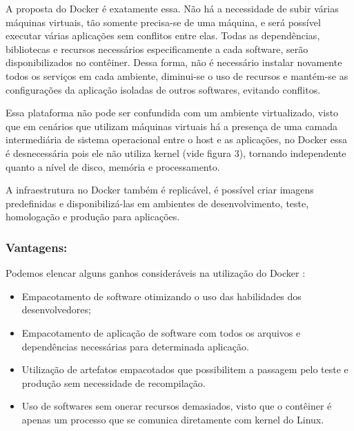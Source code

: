A proposta do Docker é exatamente essa. Não há a necessidade de subir várias máquinas virtuais, tão somente precisa-se de uma máquina, e será possível executar várias aplicações sem conflitos entre elas. Todas as dependências, bibliotecas e recursos necessários especificamente a cada software, serão disponibilizados no contêiner. Dessa forma, não é necessário instalar novamente todos os serviços em cada ambiente, diminui-se o uso de recursos e mantém-se as configurações da aplicação isoladas de outros softwares, evitando conflitos. \cite{scampini}

Essa plataforma não pode ser confundida com um ambiente virtualizado, visto que em cenários que utilizam máquinas virtuais há a presença de uma camada intermediária de sistema operacional entre o host e as aplicações, no Docker essa é desnecessária pois ele não utiliza kernel (vide figura 3), tornando independente quanto a nível de disco, memória e processamento.\cite{mouat}

A infraestrutura no Docker também é replicável, é possível criar imagens predefinidas e disponibilizá-las em ambientes de desenvolvimento, teste, homologação e produção para aplicações.\cite{mattiaskane}

\subsubsection{Vantagens:}
Podemos elencar alguns ganhos consideráveis na utilização do Docker \cite{scampini} :
\begin{itemize}
\item Empacotamento de software otimizando o uso das habilidades dos desenvolvedores;
\item Empacotamento de aplicação de software com todos os arquivos e dependências necessárias para determinada aplicação.
\item Utilização de artefatos empacotados que possibilitem a passagem pelo teste e produção sem necessidade de recompilação.
\item Uso de softwares sem onerar recursos demasiados, visto que o contêiner é apenas um processo que se comunica diretamente com kernel do Linux.
\end{itemize}

